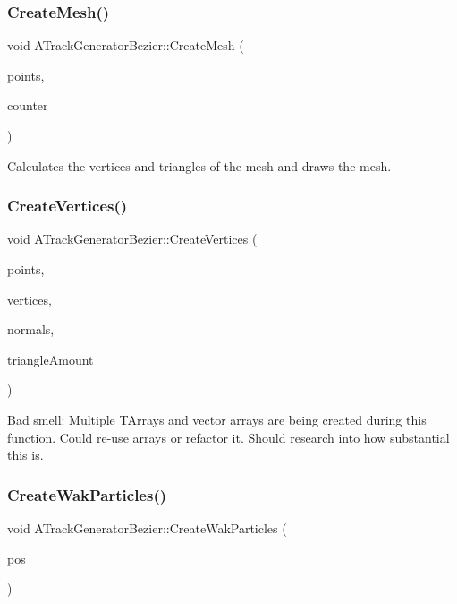 \subsubsection{\texorpdfstring{CreateMesh()}{CreateMesh()}}
{\footnotesize\ttfamily void A\+Track\+Generator\+Bezier\+::\+Create\+Mesh (\begin{DoxyParamCaption}\item[{T\+Array$<$ F\+Vector $>$}]{points,  }\item[{int}]{counter }\end{DoxyParamCaption})}



Calculates the vertices and triangles of the mesh and draws the mesh. 

\mbox{\label{class_a_track_generator_bezier_ad6951340681b89c847c10bf6f8fcd474}} 
\subsubsection{\texorpdfstring{CreateVertices()}{CreateVertices()}}
{\footnotesize\ttfamily void A\+Track\+Generator\+Bezier\+::\+Create\+Vertices (\begin{DoxyParamCaption}\item[{T\+Array$<$ F\+Vector $>$ \&}]{points,  }\item[{T\+Array$<$ F\+Vector $>$ \&}]{vertices,  }\item[{T\+Array$<$ F\+Vector $>$ \&}]{normals,  }\item[{int}]{triangle\+Amount }\end{DoxyParamCaption})}

Bad smell\+: Multiple T\+Arrays and vector arrays are being created during this function. Could re-\/use arrays or refactor it. Should research into how substantial this is. \mbox{\label{class_a_track_generator_bezier_a5997b6d3fc32dd5e2ebb18b548de593b}} 
\subsubsection{\texorpdfstring{CreateWakParticles()}{CreateWakParticles()}}
{\footnotesize\ttfamily void A\+Track\+Generator\+Bezier\+::\+Create\+Wak\+Particles (\begin{DoxyParamCaption}\item[{F\+Vector}]{pos }\end{DoxyParamCaption})}



